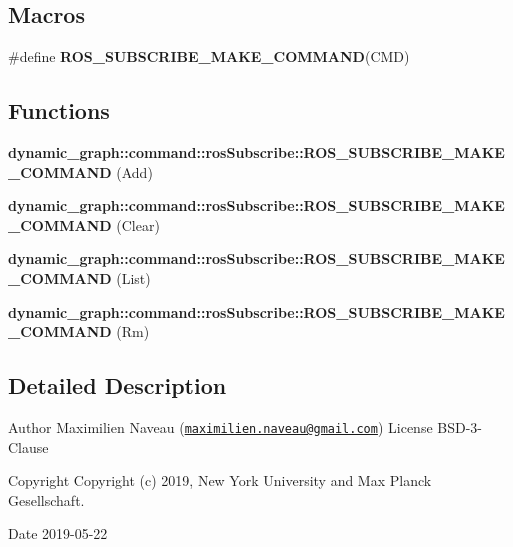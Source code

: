 \subsection*{Macros}
\begin{DoxyCompactItemize}
\item 
\#define {\bfseries R\+O\+S\+\_\+\+S\+U\+B\+S\+C\+R\+I\+B\+E\+\_\+\+M\+A\+K\+E\+\_\+\+C\+O\+M\+M\+A\+ND}(C\+MD)
\end{DoxyCompactItemize}
\subsection*{Functions}
\begin{DoxyCompactItemize}
\item 
{\bfseries dynamic\+\_\+graph\+::command\+::ros\+Subscribe\+::\+R\+O\+S\+\_\+\+S\+U\+B\+S\+C\+R\+I\+B\+E\+\_\+\+M\+A\+K\+E\+\_\+\+C\+O\+M\+M\+A\+ND} (Add)\hypertarget{ros__subscribe_8hh_a851d0a5a8fb99787dac07721efad1749}{}\label{ros__subscribe_8hh_a851d0a5a8fb99787dac07721efad1749}

\item 
{\bfseries dynamic\+\_\+graph\+::command\+::ros\+Subscribe\+::\+R\+O\+S\+\_\+\+S\+U\+B\+S\+C\+R\+I\+B\+E\+\_\+\+M\+A\+K\+E\+\_\+\+C\+O\+M\+M\+A\+ND} (Clear)\hypertarget{ros__subscribe_8hh_a9cd291bd1bf5d3ebbda624311439f01c}{}\label{ros__subscribe_8hh_a9cd291bd1bf5d3ebbda624311439f01c}

\item 
{\bfseries dynamic\+\_\+graph\+::command\+::ros\+Subscribe\+::\+R\+O\+S\+\_\+\+S\+U\+B\+S\+C\+R\+I\+B\+E\+\_\+\+M\+A\+K\+E\+\_\+\+C\+O\+M\+M\+A\+ND} (List)\hypertarget{ros__subscribe_8hh_a9538860561adf4e2f36cbf232bd4cdab}{}\label{ros__subscribe_8hh_a9538860561adf4e2f36cbf232bd4cdab}

\item 
{\bfseries dynamic\+\_\+graph\+::command\+::ros\+Subscribe\+::\+R\+O\+S\+\_\+\+S\+U\+B\+S\+C\+R\+I\+B\+E\+\_\+\+M\+A\+K\+E\+\_\+\+C\+O\+M\+M\+A\+ND} (Rm)\hypertarget{ros__subscribe_8hh_af552c361a9ea2c6a0059a8f85b1d6842}{}\label{ros__subscribe_8hh_af552c361a9ea2c6a0059a8f85b1d6842}

\end{DoxyCompactItemize}


\subsection{Detailed Description}
\begin{DoxyAuthor}{Author}
Maximilien Naveau (\href{mailto:maximilien.naveau@gmail.com}{\tt maximilien.\+naveau@gmail.\+com})  License B\+S\+D-\/3-\/\+Clause 
\end{DoxyAuthor}
\begin{DoxyCopyright}{Copyright}
Copyright (c) 2019, New York University and Max Planck Gesellschaft. 
\end{DoxyCopyright}
\begin{DoxyDate}{Date}
2019-\/05-\/22 
\end{DoxyDate}



